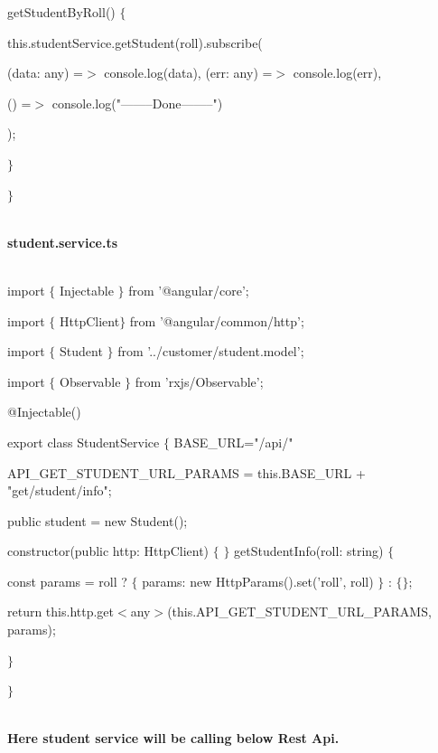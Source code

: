 \documentclass{article}
\begin{document}
\noindent getStudentByRoll() $\mathrm{\{}$ 

\noindent this.studentService.getStudent(roll).subscribe(

\noindent (data: any) =$\mathrm{>}$ console.log(data), (err: any) =$\mathrm{>}$ console.log(err),

\noindent () =$\mathrm{>}$ console.log("--------Done--------")

\noindent );

\noindent $\mathrm{\}}$

\noindent $\mathrm{\}}$

 

\noindent \\ \textbf{student.service.ts}

\noindent \textbf{}

\noindent \\ import $\mathrm{\{}$ Injectable $\mathrm{\}}$ from '@angular/core';

\noindent import $\mathrm{\{}$ HttpClient$\mathrm{\}}$ from '@angular/common/http'; 

\noindent import $\mathrm{\{}$ Student $\mathrm{\}}$ from '../customer/student.model'; 

\noindent import $\mathrm{\{}$ Observable $\mathrm{\}}$ from 'rxjs/Observable';

\noindent @Injectable()

\noindent export class StudentService $\mathrm{\{}$ BASE\_URL="/api/"

\noindent API\_GET\_STUDENT\_URL\_PARAMS = this.BASE\_URL + "get/student/info"; 

\noindent public student = new Student();

\noindent constructor(public http: HttpClient) $\mathrm{\{}$ $\mathrm{\}}$ getStudentInfo(roll: string) $\mathrm{\{}$

\noindent const params = roll ? $\mathrm{\{}$ params: new HttpParams().set('roll', roll) $\mathrm{\}}$ : $\mathrm{\{}$$\mathrm{\}}$;

\noindent return this.http.get$\mathrm{<}$any$\mathrm{>}$(this.API\_GET\_STUDENT\_URL\_PARAMS, params);

\noindent $\mathrm{\}}$

\noindent $\mathrm{\}}$

\noindent  

\noindent 

\noindent \\ \textbf{Here student service will be calling below Rest Api.}
\end{document}
